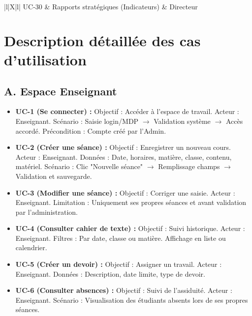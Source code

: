 \documentclass[a4paper, 11pt]{article}
\begin{document}
\begin{xltabular}{\textwidth}{|l|X|l|}
UC-30 & Rapports stratégiques (Indicateurs) & Directeur \\ \hline

\end{xltabular}
\vspace{0.5cm}

\section{Description détaillée des cas d'utilisation}

\subsection*{A. Espace Enseignant}
\begin{itemize}
    \item \textbf{UC-1 (Se connecter) :} 
    Objectif : Accéder à l'espace de travail. Acteur : Enseignant.
    Scénario : Saisie login/MDP $\rightarrow$ Validation système $\rightarrow$ Accès accordé.
    Précondition : Compte créé par l'Admin.

    \item \textbf{UC-2 (Créer une séance) :} 
    Objectif : Enregistrer un nouveau cours. Acteur : Enseignant.
    Données : Date, horaires, matière, classe, contenu, matériel.
    Scénario : Clic "Nouvelle séance" $\rightarrow$ Remplissage champs $\rightarrow$ Validation et sauvegarde.

    \item \textbf{UC-3 (Modifier une séance) :} 
    Objectif : Corriger une saisie. Acteur : Enseignant.
    Limitation : Uniquement ses propres séances et avant validation par l'administration.

    \item \textbf{UC-4 (Consulter cahier de texte) :} 
    Objectif : Suivi historique. Acteur : Enseignant.
    Filtres : Par date, classe ou matière. Affichage en liste ou calendrier.

    \item \textbf{UC-5 (Créer un devoir) :} 
    Objectif : Assigner un travail. Acteur : Enseignant.
    Données : Description, date limite, type de devoir.

    \item \textbf{UC-6 (Consulter absences) :} 
    Objectif : Suivi de l'assiduité. Acteur : Enseignant.
    Scénario : Visualisation des étudiants absents lors de ses propres séances.
\end{itemize}
\end{document}
